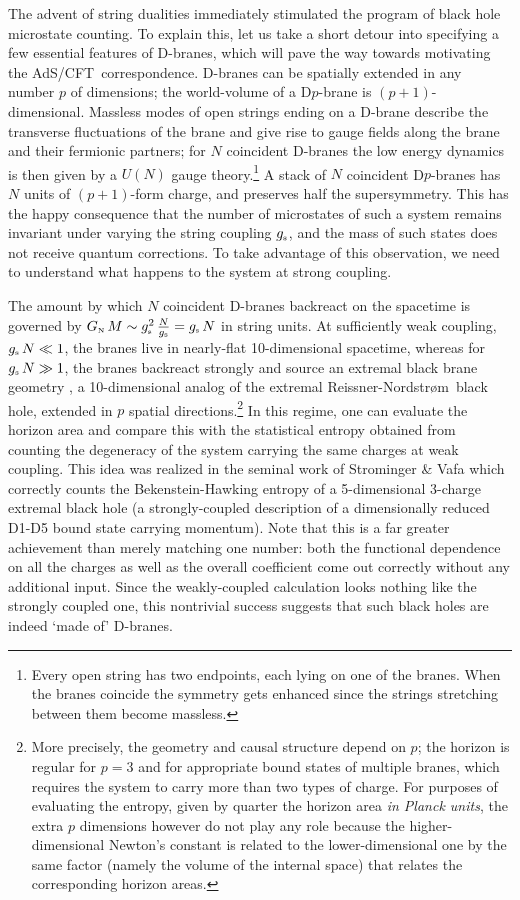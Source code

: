 \documentclass[12pt,a4paper]{article}
\def\AC{AdS/CFT}
\def\RN{Reissner-Nordstr\o m}
\def\gst{g_{\scriptscriptstyle {\rm s}}}
\def\GN{G_{\scriptscriptstyle {\rm N}}}
\begin{document}
The advent of string dualities immediately stimulated the program of black hole microstate counting.
   To explain this, let us take a short detour into specifying a few essential features of D-branes, which will pave the way towards motivating the \AC\ correspondence.
D-branes can be spatially
 extended in any number $p$ of dimensions;
   the world-volume of a  D$p$-brane is $(p+1)$-dimensional.  
  Massless modes of open strings ending on a D-brane describe the transverse fluctuations of the brane and give rise to gauge fields along the brane and their fermionic partners; for  $N$ coincident D-branes the low energy dynamics is then given by a $U(N)$ gauge theory.\footnote{
Every open string has two endpoints, each lying on one of the branes.
When the branes coincide the symmetry gets enhanced since the strings stretching between them become massless.
}  A stack of $N$ coincident D$p$-branes has $N$ units of $(p+1)$-form charge, and preserves half the supersymmetry.
 This has the happy consequence that the number of microstates of such a system  remains invariant under varying the string coupling $\gst$, and  the mass of such states does not receive quantum corrections.
To take advantage of this observation, we need to understand what happens to the system at strong coupling.  


The amount by which  $N$ coincident D-branes backreact on the spacetime is governed by 
$\GN \, M \sim \gst^2 \, \frac{N}{\gst} =  \gst \, N$ in string units.  At sufficiently weak coupling, $\gst \, N \ll 1$, the branes live in nearly-flat 10-dimensional spacetime, whereas for $\gst \, N \gg 1$, the branes backreact strongly and source an extremal black brane geometry \cite{Horowitz:1991cd}, a 10-dimensional analog of the extremal \RN\ black hole, extended in $p$ spatial directions.\footnote{
More precisely, the geometry and causal structure depend on $p$; the horizon is regular for $p=3$ and for appropriate bound states of multiple branes, which requires the system to carry more than two types of charge.
For purposes of evaluating the entropy, given by quarter the horizon area {\it in Planck units}, the extra $p$ dimensions however do not play any role because the higher-dimensional Newton's constant is related to the lower-dimensional one by the same factor (namely the volume of the internal space) that relates the corresponding horizon areas. 
}
 In this regime, one can evaluate the horizon area
 and compare this with the statistical entropy obtained from counting the degeneracy of the system carrying the same charges at weak coupling.
This idea was realized in the seminal work of Strominger \& Vafa \cite{Strominger:1996sh}
which correctly counts the Bekenstein-Hawking entropy of a  5-dimensional 3-charge extremal black hole (a strongly-coupled description of a dimensionally reduced D1-D5 bound state carrying momentum).  Note that this is  a far greater achievement than merely matching one number: both the functional dependence on all the charges as well as the overall coefficient come out correctly without any additional input.  Since the weakly-coupled calculation looks nothing like the strongly coupled one, this nontrivial success suggests that such black holes are indeed `made of' D-branes.
\end{document}
